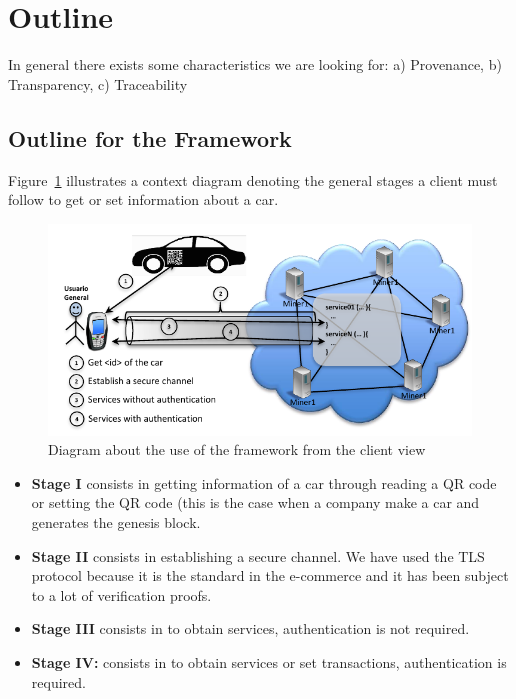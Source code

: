 \section{Outline}
\label{sec:outline}


In general there exists some characteristics we are looking for:
a) Provenance,
b) Transparency,
c) Traceability

\subsection{Outline for the Framework}
\label{subsec:proposal}
Figure~\ref{fig:flowChartFramework} illustrates a context diagram denoting
the general stages a client must follow to get or set information about a car. 
\begin{figure}[bt]
  \centering
    \includegraphics[scale=0.7]{images/gralScheme.pdf}
        \caption{Diagram about the use of the framework from the client view}
    \label{fig:flowChartFramework}
\end{figure}

\begin{itemize}
  \item \textbf{Stage I} consists in getting information of a car through reading
    a QR code or setting the QR code (this is the case when a company make a car 
    and generates the genesis block.
  \item \textbf{Stage II} consists in establishing a secure channel. We
    have used the TLS protocol because it is the standard in the
    e-commerce and it has been subject to a lot of verification proofs.  
  \item \textbf{Stage III} consists in to obtain services, authentication
    is not required.   
  \item \textbf{Stage IV:} consists in to obtain services or set transactions, 
    authentication is required.  
\end{itemize}

